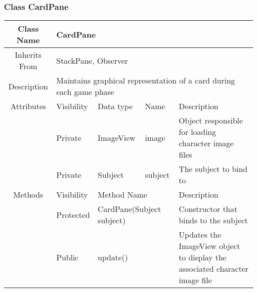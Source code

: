 \subsubsection{Class CardPane}
\begin{tabularx}{\textwidth}{|c||l|l|l|X|}
    \hline
    \cellcolor{lightgray}Class Name & \multicolumn{4}{X|}{CardPane}\\
    \hline
    \cellcolor{lightgray}Inherits From & \multicolumn{4}{X|}{StackPane, Observer}\\
    \hline
    \cellcolor{lightgray}Description & \multicolumn{4}{p{12cm}|}{Maintains graphical representation of a card during each game phase}\\
    \hline\hline
    
    \cellcolor{lightgray}Attributes & \cellcolor{lightgray}Visibility & \cellcolor{lightgray}Data type & \cellcolor{lightgray}Name & \cellcolor{lightgray}Description\\\cline{2-5}
    \cellcolor{lightgray} & Private & ImageView & image & Object responsible for loading character image files \\\cline{2-5}
    \cellcolor{lightgray} & Private & Subject & subject & The subject to bind to\\
    \hline\hline
    
    \cellcolor{lightgray}Methods & \cellcolor{lightgray}Visibility & \multicolumn{2}{l|}{\cellcolor{lightgray}Method Name} & \cellcolor{lightgray}Description\\\cline{2-5}
    \cellcolor{lightgray} & Protected & \multicolumn{2}{l|}{CardPane(Subject subject)} & Constructor that binds to the subject\\\cline{2-5}
    \cellcolor{lightgray} & Public & \multicolumn{2}{l|}{update()} & Updates the ImageView object to display the associated character image file\\
    \hline
\end{tabularx}

